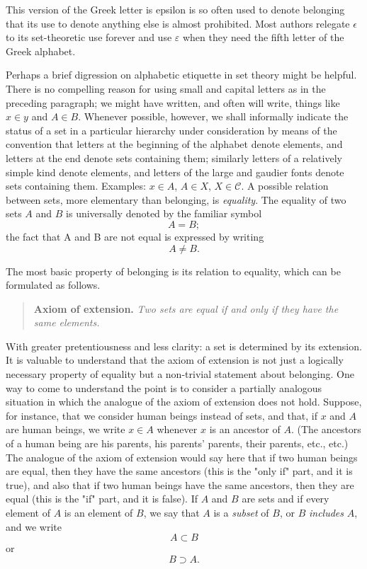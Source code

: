  This version of the Greek letter is epsilon is so often used to denote belonging that its use to denote anything else is almost prohibited. 
 Most authors relegate $\epsilon$ to its set-theoretic use forever and use $\varepsilon$ when they need the fifth letter of the Greek alphabet. 


  Perhaps a brief digression on alphabetic etiquette in set theory might be helpful. 
 There is no compelling reason for using small and capital letters as in the preceding paragraph; we might have written, and often will write, things like $x \in y$ and $A \in B$. 
 Whenever possible, however, we shall informally indicate the status of a set in a particular hierarchy under consideration by means of the convention that letters at the beginning of the alphabet denote elements, and letters at the end denote sets containing them; similarly letters of a relatively simple kind denote elements, and letters of the large and gaudier fonts denote sets containing them. 
 Examples: $x \in A$, $A \in X$, $X \in \mathcal{C}$. 
 A possible relation between sets, more elementary than belonging, is \textit{equality}. 
 The equality of two sets $A$ and $B$ is universally denoted by the familiar symbol  
    \[ A = B; \]
       the fact that A and B are not equal is expressed by writing  
     \[ A \neq B. \]
       
 The most basic property of belonging is its relation to equality, which can be formulated as follows.


  \begin{quote} 
 \textbf{Axiom of extension.} 
 \textit{Two sets are equal if and only if they have the same elements.} 
 \end{quote}


  With greater pretentiousness and less clarity: a set is determined by its extension. 
 It is valuable to understand that the axiom of extension is not just a logically necessary property of equality but a non-trivial statement about belonging. 
 One way to come to understand the point is to consider a partially analogous situation in which the analogue of the axiom of extension does not hold. 
 Suppose, for instance, that we consider human beings instead of sets, and that, if $x$ and $A$ are human beings, we write $x \in A$ whenever $x$ is an ancestor of $A$. 
 (The ancestors of a human being are his parents, his parents' parents, their parents, etc., etc.) 
 The analogue of the axiom of extension would say here that if two human beings are equal, then they have the same ancestors (this is the "only if" part, and it is true), and also that if two human beings have the same ancestors, then they are equal (this is the "if" part, and it is false). 
 If $A$ and $B$ are sets and if every element of $A$ is an element of $B$, we say that $A$ is a \textit{subset} of $B$, or $B$ \textit{includes} $A$, and we write  
     \[ A \subset B \]
       or  
	   \[ B \supset A. \]
       

